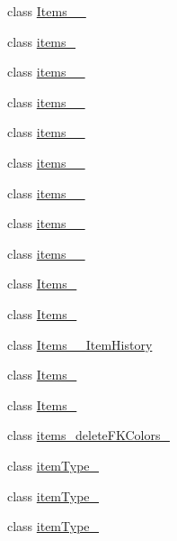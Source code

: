 \begin{DoxyCompactItemize}
\item 
class \mbox{\hyperlink{class_h_k_supply_1_1_migrations_1_1_items__12042017__3}{Items\+\_\+\_}}
\item 
class \mbox{\hyperlink{class_h_k_supply_1_1_migrations_1_1items__2}{items\+\_}}
\item 
class \mbox{\hyperlink{class_h_k_supply_1_1_migrations_1_1items__20170413__1}{items\+\_\+\_}}
\item 
class \mbox{\hyperlink{class_h_k_supply_1_1_migrations_1_1items__20170426__01}{items\+\_\+\_}}
\item 
class \mbox{\hyperlink{class_h_k_supply_1_1_migrations_1_1items__20170426__02}{items\+\_\+\_}}
\item 
class \mbox{\hyperlink{class_h_k_supply_1_1_migrations_1_1items__20170426__03}{items\+\_\+\_}}
\item 
class \mbox{\hyperlink{class_h_k_supply_1_1_migrations_1_1items__20170426__04}{items\+\_\+\_}}
\item 
class \mbox{\hyperlink{class_h_k_supply_1_1_migrations_1_1items__20170426__05}{items\+\_\+\_}}
\item 
class \mbox{\hyperlink{class_h_k_supply_1_1_migrations_1_1items__20170426__06}{items\+\_\+\_}}
\item 
class \mbox{\hyperlink{class_h_k_supply_1_1_migrations_1_1_items__3}{Items\+\_}}
\item 
class \mbox{\hyperlink{class_h_k_supply_1_1_migrations_1_1_items__31}{Items\+\_}}
\item 
class \mbox{\hyperlink{class_h_k_supply_1_1_migrations_1_1_items__32___item_history}{Items\+\_\+\_\+\+Item\+History}}
\item 
class \mbox{\hyperlink{class_h_k_supply_1_1_migrations_1_1_items__33}{Items\+\_}}
\item 
class \mbox{\hyperlink{class_h_k_supply_1_1_migrations_1_1_items__34}{Items\+\_}}
\item 
class \mbox{\hyperlink{class_h_k_supply_1_1_migrations_1_1items__delete_f_k_colors__01}{items\+\_\+delete\+F\+K\+Colors\+\_}}
\item 
class \mbox{\hyperlink{class_h_k_supply_1_1_migrations_1_1item_type__01}{item\+Type\+\_}}
\item 
class \mbox{\hyperlink{class_h_k_supply_1_1_migrations_1_1item_type__02}{item\+Type\+\_}}
\item 
class \mbox{\hyperlink{class_h_k_supply_1_1_migrations_1_1item_type__03}{item\+Type\+\_}}

\end{DoxyCompactItemize}

